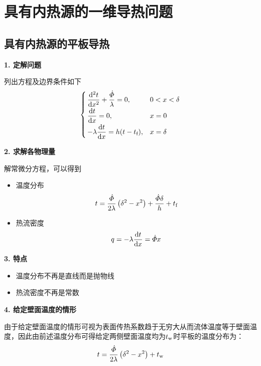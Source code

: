 \section{具有内热源的一维导热问题}
\subsection{具有内热源的平板导热}
\noindent \textbf{1. 定解问题}

列出方程及边界条件如下
\begin{align}
	\begin{cases}
		\, \dfrac{{\rm{d}}^2 t}{{\rm{d}} x^2} + \dfrac{\dot{\varPhi}}{\lambda} = 0, & 0< x < \delta\\[0.5em]
		\, \dfrac{{\rm{d}} t}{{\rm{d}} x} = 0, & x = 0\\[0.5em]
		\, - \lambda \dfrac{{\rm{d}} t}{{\rm{d}} x} = h(t - t_{\text{f}}), & x = \delta
	\end{cases}
\end{align}

\noindent \textbf{2. 求解各物理量}

解常微分方程，可以得到\vspace*{-0.5em}
\begin{itemize}
	\item 温度分布\vspace*{-1em}
	\begin{align}
		t = \dfrac{\dot{\varPhi}}{2 \lambda} \left(\delta^2 - x^2 \right) + \dfrac{\dot{\varPhi}\delta }{h}+ t_{\text{f}}
	\end{align}
	\vspace*{-1em}
	\item 热流密度\vspace*{-1em}
	\begin{align}
		q = - \lambda \dfrac{{\rm{d}} t}{{\rm{d}} x} = \dot{\varPhi }x
	\end{align}
\vspace*{-1em}
\end{itemize}

\noindent \textbf{3. 特点}\vspace*{-0.5em}
\begin{itemize}
	\item 温度分布不再是直线而是抛物线\vspace*{-0.5em}
	\item 热流密度不再是常数
\end{itemize}

\noindent \textbf{4. 给定壁面温度的情形}

由于给定壁面温度的情形可视为表面传热系数趋于无穷大从而流体温度等于壁面温度，因此由前述温度分布可得给定两侧壁面温度均为$t_{\text{w}}$时平板的温度分布为：
\begin{align}
	t = \dfrac{\dot{\varPhi}}{2 \lambda} \left(\delta^2 - x^2 \right) + t_{\text{w}}
\end{align}


